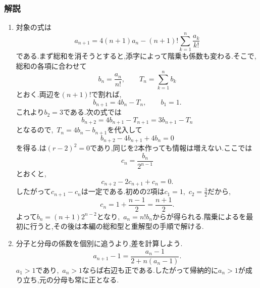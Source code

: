       \subsubsection{解説}\label{節：応用難易度：解法}\label{節：高難易度のもの：解法}
        \begin{enumerate}[label=\textbf{問\arabic*.},leftmargin=3.8em,format=\bookitemlink{practice-advanced}{solution}{problem}]
          \item 対象の式は
                \[
                  a_{n+1}=4(n+1)a_n
                    -(n+1)!\sum_{k=1}^{n}\frac{a_k}{k!}
                \]
                である.まず総和を消そうとすると,添字によって階乗も係数も変わる.そこで,総和の各項に合わせて
                \[
                  b_n=\frac{a_n}{n!},\qquad
                  T_n=\sum_{k=1}^{n}b_k
                \]
                とおく.両辺を$(n+1)!$で割れば,
                \[
                  b_{n+1}=4b_n-T_n,\qquad b_1=1.
                \]
                これより$b_2=3$である.次の式では
                \[
                  b_{n+2}=4b_{n+1}-T_{n+1}
                          =3b_{n+1}-T_n
                \]
                となるので,\, $T_n=4b_n-b_{n+1}$を代入して
                \[
                  b_{n+2}-4b_{n+1}+4b_n=0
                \]
                を得る.は$(r-2)^2=0$であり,同じを2本作っても情報は増えない.ここでは
                \[
                  c_n=\frac{b_n}{2^{n-1}}
                \]
                とおくと,
                \[
                  c_{n+2}-2c_{n+1}+c_n=0.
                \]
                したがって$c_{n+1}-c_n$は一定である.初めの2項は$c_1=1$,\, $\displaystyle c_2=\frac{3}{2}$だから,
                \[
                  c_n=1+\frac{n-1}{2}=\frac{n+1}{2}.
                \]
                よって$b_n=(n+1)2^{n-2}$となり,\, $a_n=n!b_n$からが得られる.階乗によるを最初に行うと,その後は本編の総和型と重解型の手順で解ける.
          \item 分子と分母の係数を個別に追うより,差を計算しよう.
                \[
                  a_{n+1}-1
                  =\frac{a_n-1}{2+n(a_n-1)}.
                \]
                $a_1>1$であり,\, $a_n>1$ならば右辺も正である.したがって帰納的に$a_n>1$が成り立ち,元の分母も常に正となる.


\end{enumerate}

